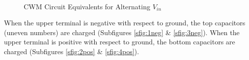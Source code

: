 \begin{figure}[H]%
    \centering
    \qquad
    \\%
    \qquad
    \caption{CWM Circuit Equivalents for Alternating $V_{in}$}%
    \label{fig:CockBothWave}%
\end{figure}

When the upper terminal is negative with respect to ground,
the top capacitors (uneven numbers) are charged (Subfigures \ref{sfig:1neg} \& \ref{sfig:3neg}).
When the upper terminal is positive with respect to ground,
the bottom capacitors are charged (Subfigures \ref{sfig:2pos} \& \ref{sfig:4pos}).

